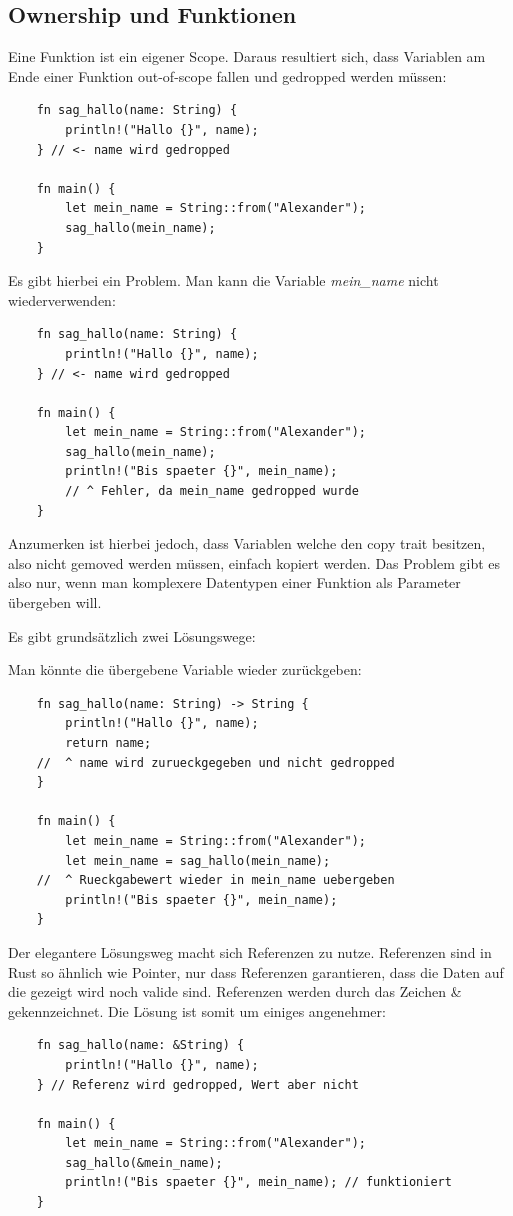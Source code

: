 \subsection{Ownership und Funktionen}
Eine Funktion ist ein eigener Scope. Daraus resultiert sich, dass Variablen am Ende einer Funktion out-of-scope fallen und gedropped werden müssen:
\begin{lstlisting}
    fn sag_hallo(name: String) {
        println!("Hallo {}", name);
    } // <- name wird gedropped

    fn main() {
        let mein_name = String::from("Alexander");
        sag_hallo(mein_name);
    }
\end{lstlisting}
Es gibt hierbei ein Problem. Man kann die Variable \textit{mein\_name} nicht wiederverwenden:
\begin{lstlisting}
    fn sag_hallo(name: String) {
        println!("Hallo {}", name);
    } // <- name wird gedropped

    fn main() {
        let mein_name = String::from("Alexander");
        sag_hallo(mein_name);
        println!("Bis spaeter {}", mein_name);
        // ^ Fehler, da mein_name gedropped wurde
    }
\end{lstlisting}
Anzumerken ist hierbei jedoch, dass Variablen welche den copy trait besitzen, also nicht gemoved werden müssen, einfach kopiert werden. Das
Problem gibt es also nur, wenn man komplexere Datentypen einer Funktion als Parameter übergeben will.

Es gibt grundsätzlich zwei Lösungswege:

Man könnte die übergebene Variable wieder zurückgeben:
\begin{lstlisting}
    fn sag_hallo(name: String) -> String {
        println!("Hallo {}", name);
        return name; 
    //  ^ name wird zurueckgegeben und nicht gedropped
    }

    fn main() {
        let mein_name = String::from("Alexander");
        let mein_name = sag_hallo(mein_name);
    //  ^ Rueckgabewert wieder in mein_name uebergeben
        println!("Bis spaeter {}", mein_name);
    }
\end{lstlisting}

Der elegantere Lösungsweg macht sich Referenzen zu nutze. Referenzen sind in Rust so ähnlich wie Pointer, nur dass Referenzen
garantieren, dass die Daten auf die gezeigt wird noch valide sind. Referenzen werden durch das Zeichen \& gekennzeichnet. Die Lösung
ist somit um einiges angenehmer:
\begin{lstlisting}
    fn sag_hallo(name: &String) {
        println!("Hallo {}", name);
    } // Referenz wird gedropped, Wert aber nicht

    fn main() {
        let mein_name = String::from("Alexander");
        sag_hallo(&mein_name);
        println!("Bis spaeter {}", mein_name); // funktioniert
    }
\end{lstlisting}

